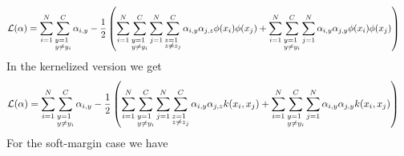 \begin{align}
	\mathcal{L}(\alpha) &= \sum_{i=1}^N \sum_{\begin{subarray}{l} y=1 \\ y\neq y_i \end{subarray}}^C \alpha_{i,y} -\frac{1}{2}\left( \sum_{i=1}^N \sum_{\begin{subarray}{l} y=1 \\ y\neq y_i \end{subarray}}^C 
		\sum_{j=1}^N \sum_{\begin{subarray}{l} z=1 \\ z\neq z_j \end{subarray}}^C 
	   \alpha_{i,y} \alpha_{j,z} \phi(x_i) \phi(x_j) 
	 +\sum_{i=1}^N \sum_{\begin{subarray}{l} y=1 \\ y\neq y_i \end{subarray}}^C 
	\sum_{j=1}^N 
	   \alpha_{i,y} \alpha_{j,y} \phi(x_i) \phi(x_j) 
	  \right)
\end{align}
In the kernelized version we get
\begin{align}
	\mathcal{L}(\alpha) &= \sum_{i=1}^N \sum_{\begin{subarray}{l} y=1 \\ y\neq y_i \end{subarray}}^C \alpha_{i,y} -\frac{1}{2}\left( \sum_{i=1}^N \sum_{\begin{subarray}{l} y=1 \\ y\neq y_i \end{subarray}}^C 
		\sum_{j=1}^N \sum_{\begin{subarray}{l} z=1 \\ z\neq z_j \end{subarray}}^C 
	   \alpha_{i,y} \alpha_{j,z} k(x_i,x_j)
	 +\sum_{i=1}^N \sum_{\begin{subarray}{l} y=1 \\ y\neq y_i \end{subarray}}^C 
	\sum_{j=1}^N 
	   \alpha_{i,y} \alpha_{j,y} k(x_i,x_j) 
	  \right)
\end{align}
For the soft-margin case we have

